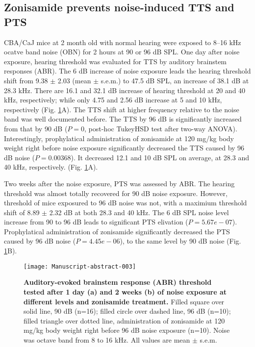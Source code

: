 \documentclass[11pt]{article}
\begin{document}
\subsection {Zonisamide prevents noise-induced TTS and PTS}




CBA/CaJ mice at 2 month old with normal hearing were exposed to 8--16 kHz ocatve band noise (OBN) for 2 hours at 90 or 96 dB SPL. One day after noise exposure, hearing threshold was evaluated for TTS by auditory brainstem responses (ABR). The 6 dB increase of noise exposure leads the hearing threshold shift from 
9.38 
$\pm$ 
2.03 
(mean $\pm$ s.e.m.) to 
47.5 dB SPL, an increase of 38.1 
dB at 28.3 kHz. There are 
16.1 
and 
32.1 
dB increase of hearing threshold at 20 and 40 kHz, respectively; while only 
4.75 
and 
2.56 
dB increase at 5 and 10 kHz, respectively (Fig. \ref{fig:Figure1}A). The TTS shift at higher frequency relative to the noise band was well documented before. The TTS by 96 dB is significantly increased from that by 90 dB 
($P = 0$, post-hoc TukeyHSD test after two-way ANOVA). 
Interestingly, prophylatical administration of zonisamide at 120 mg/kg body weight right before noise exposure significantly decreased the TTS caused by 96 dB noise 
($P = 0.00368$). It decreased 12.1 and 10 dB SPL on average, at 28.3 and 40 kHz, respectively.
(Fig. \ref{fig:Figure1}A).

Two weeks after the noise exposure, PTS was assessed by ABR. The hearing threshold was almost totally recovered for 90 dB noise exposure. However, threshold of mice exposured to 96 dB noise was not, with a maximium threshold shift of 8.89 $\pm$ 2.32 dB at both 28.3 and 40 kHz. The 6 dB SPL noise level increase from 90 to 96 dB leads to significant PTS elivation 
($P = 5.67e-07 $).
Prophylatical administration of zonisamide significantly decreased the PTS caused by 96 dB noise 
($P = 4.45e-06 $), to the same level by 90 dB noise (Fig. \ref{fig:Figure1}B).



\begin{figure}[ht!]
\centering
\texttt{[image: Manuscript-abstract-003]}

\caption{{\bf {Auditory-evoked brainstem response (ABR) threshold tested after 1 day (a) and 2 weeks (b) of noise exposure at different levels and zonisamide treatment.}} Filled square over solid line, 90 dB (n=16); filled circle over dashed line, 96 dB (n=10); filled triangle over dotted line, administration of zonisamide at 120 mg/kg body weight right before 96 dB noise exposure (n=10). Noise was octave band from 8 to 16 kHz. All values are mean $\pm$ s.e.m.}
\label{fig:Figure1}
\end{figure}
\end{document}
